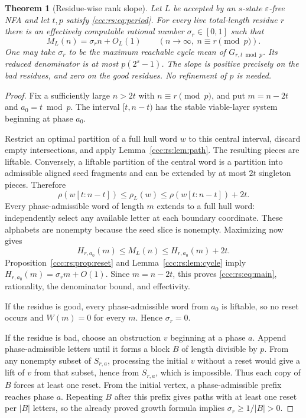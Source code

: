\documentclass[11pt,letterpaper]{article}
\newtheorem{theorem}{Theorem}[section]
\theoremstyle{definition}
\theoremstyle{remark}
\newcommand{\eps}{\varepsilon}
\newcommand{\rank}{\rho}
\begin{document}
\begin{theorem}[Residue-wise rank slope]\label{ccc:rs:thm:slope}
Let $L$ be accepted by an $s$-state $\eps$-free NFA and let $t,p$ satisfy \eqref{ccc:rs:eq:period}. For every live total-length residue $r$ there is an effectively computable rational number $\sigma_r\in[0,1]$ such that
\begin{equation}\label{ccc:rs:eq:main}
M_L(n)=\sigma_r n+O_L(1)
\qquad(n\to\infty,\ n\equiv r\pmod p).
\end{equation}
One may take $\sigma_r$ to be the maximum reachable cycle mean of $G_{r,t\bmod p}$. Its reduced denominator is at most $p(2^s-1)$. The slope is positive precisely on the bad residues, and zero on the good residues. No refinement of $p$ is needed.
\end{theorem}
\begin{proof}
Fix a sufficiently large $n>2t$ with $n\equiv r\pmod p$, and put $m=n-2t$ and $a_0=t\bmod p$. The interval $[t,n-t)$ has the stable viable-layer system beginning at phase $a_0$.

Restrict an optimal partition of a full hull word $w$ to this central interval, discard empty intersections, and apply Lemma~\ref{ccc:rs:lem:path}. The resulting pieces are liftable. Conversely, a liftable partition of the central word is a partition into admissible aligned seed fragments and can be extended by at most $2t$ singleton pieces. Therefore
\[
\rho(w[t:n-t])\le\rank_L(w)\le\rho(w[t:n-t])+2t.
\]
Every phase-admissible word of length $m$ extends to a full hull word: independently select any available letter at each boundary coordinate. These alphabets are nonempty because the seed slice is nonempty. Maximizing now gives
\begin{equation}\label{ccc:rs:eq:sandwich}
H_{r,a_0}(m)\le M_L(n)\le H_{r,a_0}(m)+2t.
\end{equation}
Proposition~\ref{ccc:rs:prop:reset} and Lemma~\ref{ccc:rs:lem:cycle} imply
$H_{r,a_0}(m)=\sigma_r m+O(1)$. Since $m=n-2t$, this proves \eqref{ccc:rs:eq:main}, rationality, the denominator bound, and effectivity.

If the residue is good, every phase-admissible word from $a_0$ is liftable, so no reset occurs and $W(m)=0$ for every $m$. Hence $\sigma_r=0$.

If the residue is bad, choose an obstruction $v$ beginning at a phase $a$. Append phase-admissible letters until it forms a block $B$ of length divisible by $p$. From any nonempty subset of $S_{r,a}$, processing the initial $v$ without a reset would give a lift of $v$ from that subset, hence from $S_{r,a}$, which is impossible. Thus each copy of $B$ forces at least one reset. From the initial vertex, a phase-admissible prefix reaches phase $a$. Repeating $B$ after this prefix gives paths with at least one reset per $|B|$ letters, so the already proved growth formula implies $\sigma_r\ge1/|B|>0$.
\end{proof}
\end{document}
